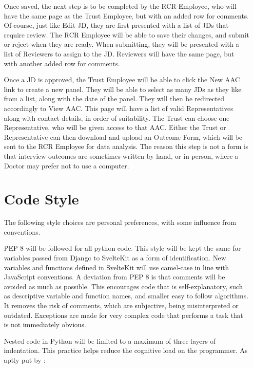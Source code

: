 Once saved, the next step is to be completed by the RCR Employee, who will have the same page as the Trust Employee, but with an added row for comments. Of-course, just like Edit JD, they are first presented with a list of JDs that require review. The RCR Employee will be able to save their changes, and submit or reject when they are ready. When submitting, they will be presented with a list of Reviewers to assign to the JD. Reviewers will have the same page, but with another added row for comments. 

Once a JD is approved, the Trust Employee will be able to click the New AAC link to create a new panel. They will be able to select as many JDs as they like from a list, along with the date of the panel. They will then be redirected accordingly to View AAC. This page will have a list of valid Representatives along with contact details, in order of suitability. The Trust can choose one Representative, who will be given access to that AAC. Either the Trust or Representative can then download and upload an Outcome Form, which will be sent to the RCR Employee for data analysis. The reason this step is not a form is that interview outcomes are sometimes written by hand, or in person, where a Doctor may prefer not to use a computer.

\clearpage
\section{Code Style}
The following style choices are personal preferences, with some influence from conventions. 

PEP 8 \parencite{guido_van_rossum_pep_2013} will be followed for all python code. This style will be kept the same for variables passed from Django to SvelteKit as a form of identification. New variables and functions defined in SvelteKit will use camel-case in line with JavaScript conventions. A deviation from PEP 8 is that comments will be avoided as much as possible. This encourages code that is self-explanatory, such as descriptive variable and function names, and smaller easy to follow algorithms. It removes the risk of comments, which are subjective, being misinterpreted or outdated. Exceptions are made for very complex code that performs a task that is not immediately obvious.

Nested code in Python will be limited to a maximum of three layers of indentation. This practice helps reduce the cognitive load on the programmer. As aptly put by \textcite{the_kernel_development_community_linux_2024}:

